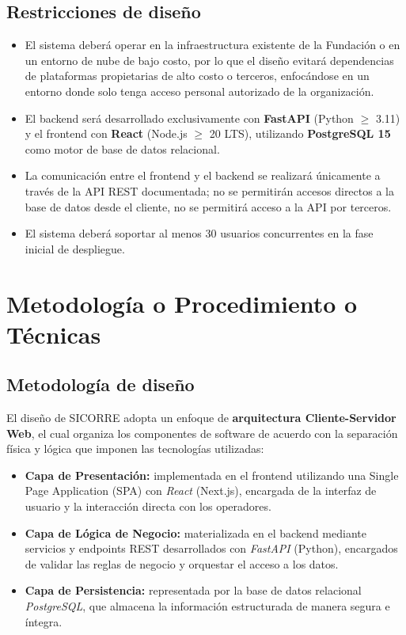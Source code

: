 \subsection*{Restricciones de diseño}

\begin{itemize}
	\item El sistema deberá operar en la infraestructura existente de la Fundación o en
	un entorno de nube de bajo costo, por lo que el diseño evitará dependencias de
	plataformas propietarias de alto costo o terceros, enfocándose en un entorno donde solo 
	tenga acceso personal autorizado de la organización.
	\item El backend será desarrollado exclusivamente con \textbf{FastAPI} (Python $\geq$ 3.11)
	y el frontend con \textbf{React} (Node.js $\geq$ 20 LTS), utilizando
	\textbf{PostgreSQL 15} como motor de base de datos relacional.
	\item La comunicación entre el frontend y el backend se realizará únicamente a través
	de la API REST documentada; no se permitirán accesos directos a la base de datos
	desde el cliente, no se permitirá acceso a la API por terceros.
	\item El sistema deberá soportar al menos 30 usuarios concurrentes en la fase inicial
	de despliegue.
\end{itemize}

\section{Metodología o Procedimiento o Técnicas}

\subsection*{Metodología de diseño}

El diseño de SICORRE adopta un enfoque de \textbf{arquitectura Cliente-Servidor Web}, el cual
organiza los componentes de software de acuerdo con la separación física y lógica que imponen
las tecnologías utilizadas:

\begin{itemize}
	\item \textbf{Capa de Presentación:} implementada en el frontend utilizando una Single
	Page Application (SPA) con \textit{React} (Next.js), encargada de la interfaz de usuario
	y la interacción directa con los operadores.
	\item \textbf{Capa de Lógica de Negocio:} materializada en el backend mediante servicios
	y endpoints REST desarrollados con \textit{FastAPI} (Python), encargados de validar las
	reglas de negocio y orquestar el acceso a los datos.
	\item \textbf{Capa de Persistencia:} representada por la base de datos relacional
	\textit{PostgreSQL}, que almacena la información estructurada de manera segura e íntegra.
\end{itemize}

